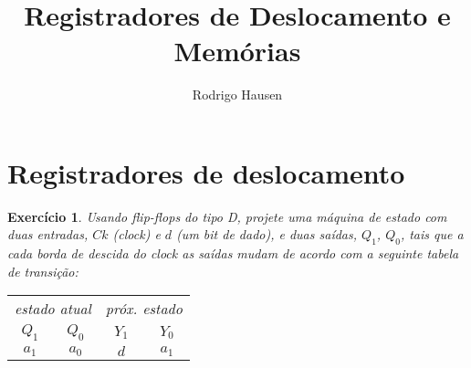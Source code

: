 \documentclass[a4paper,12pt,notitlepage]{article}
\title{Registradores de Deslocamento e Memórias}
\author{Rodrigo Hausen}
\date{}
\newtheorem{exer}{Exercício}
\begin{document}
\maketitle

\section{Registradores de deslocamento}

\begin{exer}
Usando \emph{flip-flops} do tipo D, projete uma máquina de estado com duas
entradas, $Ck$ (\emph{clock}) e $d$ (um bit de dado), e duas saídas, $Q_1$,
$Q_0$, tais que a cada borda de descida do clock as saídas mudam de acordo
com a seguinte tabela de transição:
\begin{center}
\begin{tabular}{cc||cc}
\multicolumn{2}{r||}{estado atual} & \multicolumn{2}{l}{próx. estado} \\
$Q_1$ & $Q_0$ & $Y_1$ & $Y_0$ \\
\hline
$a_1$ & $a_0$ & $d$   & $a_1$
\end{tabular}
\end{center}
\end{exer}
\end{document}

